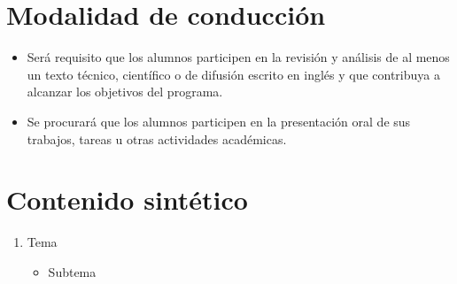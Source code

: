 \documentclass[10pt,letterpaper]{article}
\begin{document}
\begin{multicols}{2}
\section*{Modalidad de conducción}
\color{black}
\begin{itemize}
  \itemsep-0.2em
	\item Será requisito que los alumnos participen en la revisión y análisis de al 
	menos un texto técnico, científico o de difusión escrito en inglés y que 
	contribuya a alcanzar los objetivos del programa.
	\item Se procurará que los alumnos participen en la presentación oral de sus 
	trabajos, tareas u otras actividades académicas.
\end{itemize}

\section*{Contenido sintético}
\color{black}
\begin{enumerate}
  \itemsep-0.3em
	\item Tema
	\begin{itemize}
		\item Subtema
	\end{itemize}
\end{enumerate}

\end{multicols}
\end{document}
